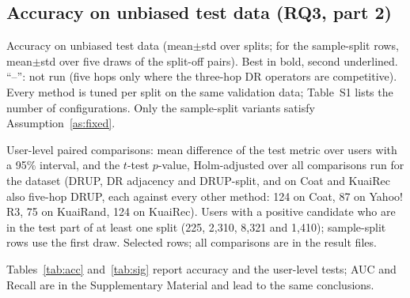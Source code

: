 \documentclass[preprint,review,12pt,authoryear]{elsarticle}
\theoremstyle{definition}
\begin{document}
\subsection{Accuracy on unbiased test data (RQ3, part 2)}\label{sec:acc}

\begin{table}[t]\centering\small
\caption{Accuracy on unbiased test data (mean$\pm$std over splits; for the
sample-split rows, mean$\pm$std over five draws of the split-off pairs). Best in
bold, second underlined. ``--'': not run (five hops only where the three-hop DR
operators are competitive). Every method is tuned per split on the same
validation data; Table~S1 lists the number of configurations.
Only the sample-split variants satisfy Assumption~\ref{as:fixed}.}\label{tab:acc}
\begin{adjustbox}{max width=\textwidth}

\end{adjustbox}
\end{table}

\begin{table}[t]\centering\small
\caption{User-level paired comparisons: mean difference of the test metric
over users with a 95\% interval, and the $t$-test $p$-value, Holm-adjusted over
all comparisons run for the dataset (DRUP, DR adjacency and DRUP-split, and on Coat and KuaiRec also five-hop DRUP, each
against every other method: 124 on Coat, 87 on Yahoo!\,R3, 75 on KuaiRand, 124 on KuaiRec). Users with a positive
candidate who are in the test part of at least one split (225, 2{,}310, 8{,}321 and
1{,}410); sample-split rows use the first draw. Selected rows; all comparisons
are in the result files.}\label{tab:sig}
\begin{adjustbox}{max width=\textwidth}

\end{adjustbox}
\end{table}

Tables~\ref{tab:acc} and~\ref{tab:sig} report accuracy and the user-level tests;
AUC and Recall are in the Supplementary Material and lead to the same conclusions.
\end{document}
